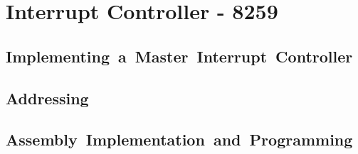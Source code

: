 \section{Interrupt Controller - 8259}

    \subsection{Implementing a Master Interrupt Controller}

    \subsection{Addressing}

    \subsection{Assembly Implementation and Programming}
